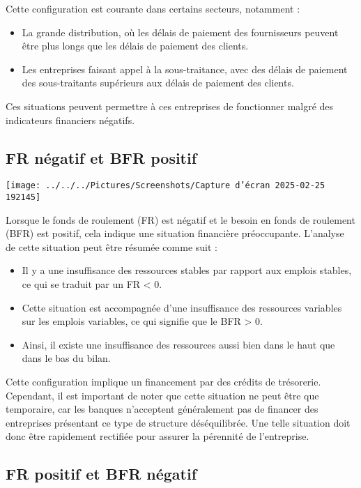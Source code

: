 \documentclass[a4paper, 12pt]{report}
\begin{document}
Cette configuration est courante dans certains secteurs, notamment :

\begin{itemize}
	\item La grande distribution, où les délais de paiement des fournisseurs peuvent être plus longs que les délais de paiement des clients.
	\item Les entreprises faisant appel à la sous-traitance, avec des délais de paiement des sous-traitants supérieurs aux délais de paiement des clients.
\end{itemize}

Ces situations peuvent permettre à ces entreprises de fonctionner malgré des indicateurs financiers négatifs.

\subsection{FR négatif et BFR positif}

\begin{center}
	\texttt{[image: ../../../Pictures/Screenshots/Capture d'écran 2025-02-25 192145]}
\end{center}

Lorsque le fonds de roulement (FR) est négatif et le besoin en fonds de roulement (BFR) est positif, cela indique une situation financière préoccupante. L'analyse de cette situation peut être résumée comme suit :

\begin{itemize}
	\item Il y a une insuffisance des ressources stables par rapport aux emplois stables, ce qui se traduit par un FR < 0.
	\item Cette situation est accompagnée d'une insuffisance des ressources variables sur les emplois variables, ce qui signifie que le BFR > 0.
	\item Ainsi, il existe une insuffisance des ressources aussi bien dans le haut que dans le bas du bilan.
\end{itemize}

Cette configuration implique un financement par des crédits de trésorerie. Cependant, il est important de noter que cette situation ne peut être que temporaire, car les banques n'acceptent généralement pas de financer des entreprises présentant ce type de structure déséquilibrée. Une telle situation doit donc être rapidement rectifiée pour assurer la pérennité de l'entreprise.

\subsection{FR positif et BFR négatif}
\end{document}
